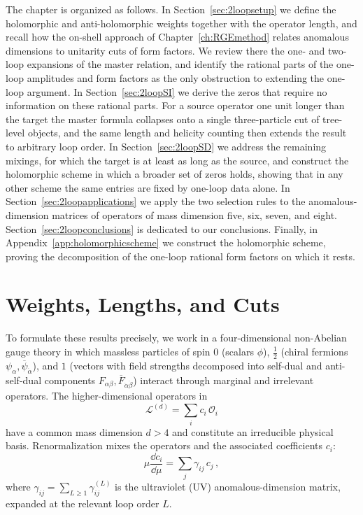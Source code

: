 The chapter is organized as follows. In Section~\ref{sec:2loopsetup} we define the holomorphic and
anti-holomorphic weights together with the operator length, and recall how the on-shell approach of
Chapter~\ref{ch:RGEmethod} relates anomalous dimensions to unitarity cuts of form factors. We review
there the one- and two-loop expansions of the master relation, and identify the rational parts of the
one-loop amplitudes and form factors as the only obstruction to extending the one-loop argument. In
Section~\ref{sec:2loopSI} we derive the zeros that require no information on these rational parts.
For a source operator one unit longer than the target the master formula collapses onto a single
three-particle cut of tree-level objects, and the same length and helicity counting then extends the
result to arbitrary loop order. In Section~\ref{sec:2loopSD} we address the remaining mixings, for
which the target is at least as long as the source, and construct the holomorphic scheme in which a
broader set of zeros holds, showing that in any other scheme the same entries are fixed by one-loop
data alone. In Section~\ref{sec:2loopapplications} we apply the two selection rules to the
anomalous-dimension matrices of operators of mass dimension five, six, seven, and eight.
Section~\ref{sec:2loopconclusions} is dedicated to our conclusions. Finally, in
Appendix~\ref{app:holomorphicscheme} we construct the holomorphic scheme, proving the decomposition
of the one-loop rational form factors on which it rests.

\section{Weights, Lengths, and Cuts\label{sec:2loopsetup}}

To formulate these results precisely, we work in a four-dimensional non-Abelian gauge theory in which massless particles of spin $0$ (scalars $\phi$), $\frac{1}{2}$ (chiral fermions $\psi_\alpha,\overline\psi_{\dot\alpha}$), and $1$ (vectors with field strengths decomposed into self-dual and anti-self-dual components $F_{\alpha\beta},\overline F_{\dot\alpha\dot\beta}$) interact through marginal and irrelevant operators.
The higher-dimensional operators in
\begin{equation}
    \mathcal L^{(d)} = \sum_i c_i \, \mathcal O_i
\end{equation}
have a common mass dimension $d > 4$ and constitute an irreducible physical basis.
%
Renormalization mixes the operators and the associated coefficients $c_i$:
\begin{equation}
    \mu \frac{\dd c_i}{\dd \mu} = \sum_j \gamma_{ij}\,c_j\,,
\end{equation}
where $\gamma_{ij} = \sum_{L\ge 1}\gamma_{ij}^{(L)}$ is the ultraviolet (UV) anomalous-dimension matrix,
expanded at the relevant loop order $L$.

